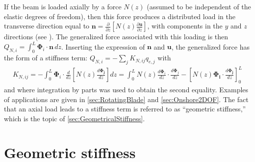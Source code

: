 \documentclass[wes, manuscript]{copernicus}
\renewcommand{\v}[1]{\boldsymbol{#1}}
\newcommand{\todoBoth}    [1]{{\colorbox{yellow}{TODO Both:    }}{\color{red}{#1}}\colorbox{yellow}{/}}
\begin{document}
If the beam is loaded axially by a force $N(z)$ (assumed to be independent of the elastic degrees of freedom), then this force produces a distributed load in the transverse direction equal to $\v{n} = \frac{\partial}{\partial z}\left[N(z)\frac{\partial \v{u}}{\partial z}\right]$, with components in the $y$ and $z$ directions (see \cite{branlard:2019flex}).
The generalized force associated with this loading is then $Q_{N,i}=\int_0^L \v{\Phi}_i\cdot \v{n}\, dz$.
Inserting the expression of $\v{n}$ and $\v{u}$, the generalized force has the form of a stiffness term: $Q_{N,i} =-\sum_j K_{N,ij} q_{e,j}$ with
\begin{align}
   K_{N,ij} = -\int_0^L \v{\Phi}_i \cdot \frac{d}{d z} \left[N(z) \frac{d \v{\Phi_j}}{d z}\right] dz  
       = \int_0^L N(z) \frac{d \v{\Phi}_i }{dz}\cdot \frac{d \v{\Phi}_j }{dz} - \left[N(z) \v{\Phi_i}\cdot \frac{d\v{\Phi_j}}{dz}\right]_0^L
   \label{eq:StiffnessAxial}
\end{align}
and where integration by parts was used to obtain the second equality.
Examples of applications are given in \autoref{sec:RotatingBlade} and \autoref{sec:Onshore2DOF}.
The fact that an axial load leads to a stiffness term is referred to as ``geometric stiffness,'' which is the topic of \autoref{sec:GeometricalStiffness}.





\section{Geometric stiffness}
\label{sec:GeometricalStiffness}
\end{document}
